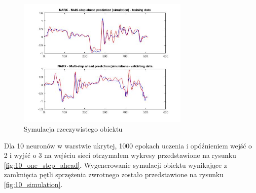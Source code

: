 \documentclass{article}
\begin{document}
\begin{figure}[H]
\centering
	\includegraphics[width=0.75\textwidth,keepaspectratio]{5_simulation.jpg}
\caption{Symulacja rzeczywistego obiektu}
		\label{fig:5_simulation}
\end{figure}



Dla 10 neuronów w warstwie ukrytej, 1000 epokach uczenia i opóźnieniem
wejść o 2 i wyjść o 3 na wejściu sieci otrzymałem wykresy przedstawione
na rysunku \ref{fig:10_one_step_ahead}.
Wygenerowanie symulacji obiektu wynikające z zamknięcia pętli sprzężenia zwrotnego
zostało przedstawione na rysunku \ref{fig:10_simulation}.
\end{document}
